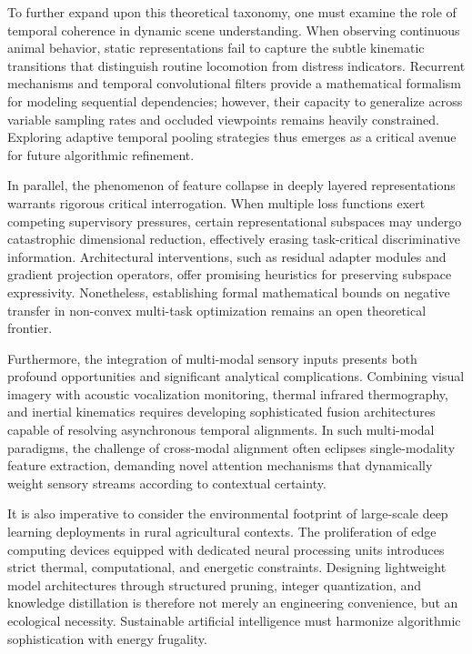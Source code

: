 \documentclass[Times,12pt,oneside,openany,print,index]{report}
\begin{document}
To further expand upon this theoretical taxonomy, one must examine the role of temporal coherence in dynamic scene understanding. When observing continuous animal behavior, static representations fail to capture the subtle kinematic transitions that distinguish routine locomotion from distress indicators. Recurrent mechanisms and temporal convolutional filters provide a mathematical formalism for modeling sequential dependencies; however, their capacity to generalize across variable sampling rates and occluded viewpoints remains heavily constrained. Exploring adaptive temporal pooling strategies thus emerges as a critical avenue for future algorithmic refinement.

In parallel, the phenomenon of feature collapse in deeply layered representations warrants rigorous critical interrogation. When multiple loss functions exert competing supervisory pressures, certain representational subspaces may undergo catastrophic dimensional reduction, effectively erasing task-critical discriminative information. Architectural interventions, such as residual adapter modules and gradient projection operators, offer promising heuristics for preserving subspace expressivity. Nonetheless, establishing formal mathematical bounds on negative transfer in non-convex multi-task optimization remains an open theoretical frontier.

Furthermore, the integration of multi-modal sensory inputs presents both profound opportunities and significant analytical complications. Combining visual imagery with acoustic vocalization monitoring, thermal infrared thermography, and inertial kinematics requires developing sophisticated fusion architectures capable of resolving asynchronous temporal alignments. In such multi-modal paradigms, the challenge of cross-modal alignment often eclipses single-modality feature extraction, demanding novel attention mechanisms that dynamically weight sensory streams according to contextual certainty.

It is also imperative to consider the environmental footprint of large-scale deep learning deployments in rural agricultural contexts. The proliferation of edge computing devices equipped with dedicated neural processing units introduces strict thermal, computational, and energetic constraints. Designing lightweight model architectures through structured pruning, integer quantization, and knowledge distillation is therefore not merely an engineering convenience, but an ecological necessity. Sustainable artificial intelligence must harmonize algorithmic sophistication with energy frugality.
\end{document}
